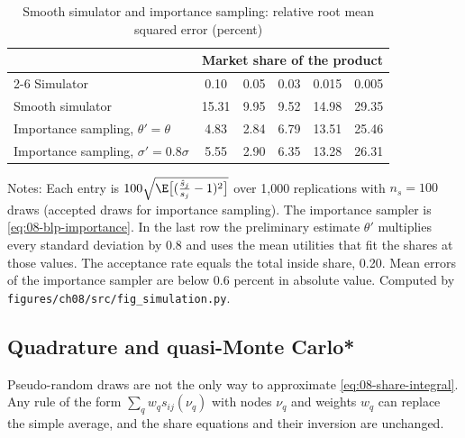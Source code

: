 \begin{table}[htbp]
\centering
\caption{Smooth simulator and importance sampling: relative root mean squared error (percent)}\label{tab:08-importance}
\begin{tabular}{lccccc}
\toprule
 & \multicolumn{5}{c}{Market share of the product} \\
\cmidrule(lr){2-6}
Simulator & 0.10 & 0.05 & 0.03 & 0.015 & 0.005 \\
\midrule
Smooth simulator & 15.31 & 9.95 & 9.52 & 14.98 & 29.35 \\
Importance sampling, $\theta' = \theta$ & 4.83 & 2.84 & 6.79 & 13.51 & 25.46 \\
Importance sampling, $\sigma' = 0.8\sigma$ & 5.55 & 2.90 & 6.35 & 13.28 & 26.31 \\
\bottomrule
\end{tabular}

\smallskip
\begin{minipage}{0.9\linewidth}
\footnotesize Notes: Each entry is $100\sqrt{\E\bigl[(\frac{\hat s_j}{s_j} - 1)^2\bigr]}$ over 1,000 replications
with $n_s = 100$ draws (accepted draws for importance sampling). The importance sampler is
\eqref{eq:08-blp-importance}. In the last row the preliminary estimate $\theta'$ multiplies every standard deviation by
0.8 and uses the mean utilities that fit the shares at those values. The acceptance rate equals the total inside share,
0.20. Mean errors of the importance sampler are below 0.6 percent in absolute value. Computed by
\texttt{figures/ch08/src/fig\_simulation.py}.
\end{minipage}
\end{table}

\subsection{Quadrature and quasi-Monte Carlo*}\label{sec:08-quadrature}

Pseudo-random draws are not the only way to approximate \eqref{eq:08-share-integral}. Any rule of the form $\sum_q w_q
s_{ij}(\nu_q)$ with nodes $\nu_q$ and weights $w_q$ can replace the simple average, and the share equations and
their inversion are unchanged.

